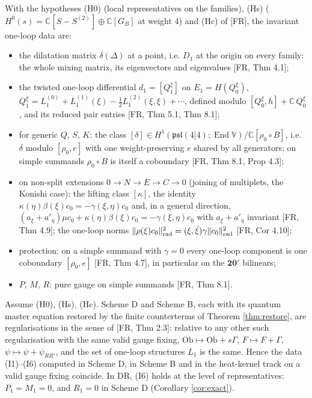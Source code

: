 \begin{definition}
\label{def:targets}
With the hypotheses (H0) (local representatives on the families), (Hs) ($H^0(s)=\mathbb C[S-S^{(2)}]\oplus\mathbb C[G_B]$ at weight $4$) and (Hc) of [FR], the invariant one-loop data are:
\begin{itemize}
\item[(I1)] the dilatation matrix $\delta(\Delta)$ at a point, i.e. $D_1$ at the origin on every family: the whole mixing matrix, its eigenvectors and eigenvalues [FR, Thm 4.1];
\item[(I2)] the twisted one-loop differential $d_1=[Q^\xi_1]$ on $E_1=H(Q^\xi_0)$, $Q^\xi_1=L_1^{(0)}+L_1^{(1)}(\xi)-\frac12L_1^{(2)}(\xi,\xi)+\cdots$, defined modulo $[Q^\xi_0,h]+\mathbb C\,Q^\xi_0$, and its reduced pair entries [FR, Thm 5.1, Thm 8.1];
\item[(I3)] for generic $Q$, $S$, $K$: the class $[\delta]\in H^1(\mathfrak{psl}(4|4);\operatorname{End}\mathbb V)/\mathbb C[\rho_0\circ B]$, i.e. $\delta$ modulo $[\rho_0,e]$ with one weight-preserving $e$ shared by all generators; on simple summands $\rho_0\circ B$ is itself a coboundary [FR, Thm 8.1, Prop 4.3];
\item[(I4)] on non-split extensions $0\to N\to E\to C\to0$ (joining of multiplets, the Konishi case): the lifting class $[\kappa]$, the identity $\kappa(\eta)\beta(\xi)c_0=-\gamma(\xi,\eta)c_0$ and, in a general direction, $(a_\xi+a'_\eta)\mu c_0+\kappa(\eta)\beta(\xi)c_0=-\gamma(\xi,\eta)c_0$ with $a_\xi+a'_\eta$ invariant [FR, Thm 4.9]; the one-loop norms $\|\rho(\xi)c_0\|^2_{\rm rad}=(\xi,\bar\xi)\gamma\|c_0\|^2_{\rm rad}$ [FR, Cor 4.10];
\item[(I5)] protection: on a simple summand with $\gamma=0$ every one-loop component is one coboundary $[\rho_0,e]$ [FR, Thm 4.7], in particular on the $\mathbf{20}'$ bilinears;
\item[(I6)] $P$, $M$, $R$: pure gauge on simple summands [FR, Thm 8.1].
\end{itemize}
\end{definition}

\begin{theorem}
\label{thm:inv}
Assume (H0), (Hs), (Hc). Scheme D and Scheme B, each with its quantum master equation restored by the finite counterterms of Theorem \ref{thm:restore}, are regularisations in the sense of [FR, Thm 2.3]: relative to any other such regularisation with the same valid gauge fixing, $\mathrm{Ob}\mapsto\mathrm{Ob}+s\Gamma$, $F\mapsto F+\Gamma$, $\psi\mapsto\psi+\psi_{RR'}$, and the set of one-loop structures $L_1$ is the same. Hence the data (I1)--(I6) computed in Scheme D, in Scheme B and in the heat-kernel track on a valid gauge fixing coincide. In DR, (I6) holds at the level of representatives: $P_1=M_1=0$, and $R_1=0$ in Scheme D (Corollary \ref{cor:exact}).
\end{theorem}

